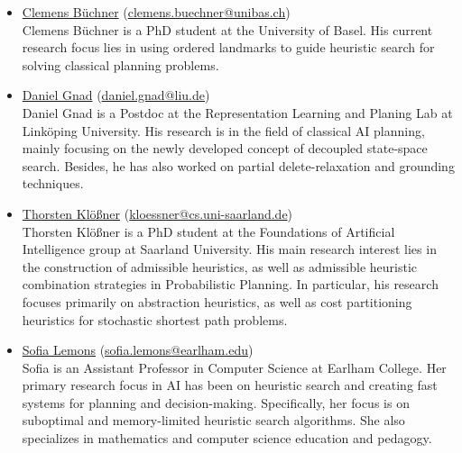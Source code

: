 \documentclass[10pt]{article}
\begin{document}
\newcommand{\organizer}[4]{\href{#2}{#1} (\href{mailto:#3}{#3})\\{#4}}
\begin{itemize}

\item \organizer{Clemens B\"uchner}{https://ai.dmi.unibas.ch/people/buechner/}{clemens.buechner@unibas.ch}
Clemens B\"uchner is a PhD student at the University of Basel. His current
research focus lies in using ordered landmarks to guide heuristic search for
solving classical planning problems.

\item \organizer{Daniel Gnad}{https://rlplab.com/daniel-gnad/}{daniel.gnad@liu.de}
Daniel Gnad is a Postdoc at the Representation Learning and Planing Lab at
Link\"oping University. His research is in the field of classical AI planning,
mainly focusing on the newly developed concept of decoupled state-space search.
Besides, he has also worked on partial delete-relaxation and grounding
techniques.

\item \organizer{Thorsten Kl\"o\ss{}ner}{http://fai.cs.uni-saarland.de/kloessner/}{kloessner@cs.uni-saarland.de}
Thorsten Kl\"o\ss{}ner is a PhD student at the Foundations of Artificial
Intelligence group at Saarland University. His main research interest lies in
the construction of admissible heuristics, as well as admissible heuristic
combination strategies in Probabilistic Planning. In particular, his research
focuses primarily on abstraction heuristics, as well as cost partitioning
heuristics for stochastic shortest path problems.

\item \organizer{Sofia Lemons}{https://earlham.edu/faculty-staff/sofia-lemons/}{sofia.lemons@earlham.edu}
Sofia is an Assistant Professor in Computer Science at Earlham
College. Her primary research focus in AI has been on heuristic search
and creating fast systems for planning and
decision-making. Specifically, her focus is on suboptimal and
memory-limited heuristic search algorithms. She also specializes in
mathematics and computer science education and pedagogy.




\end{itemize}
\end{document}

